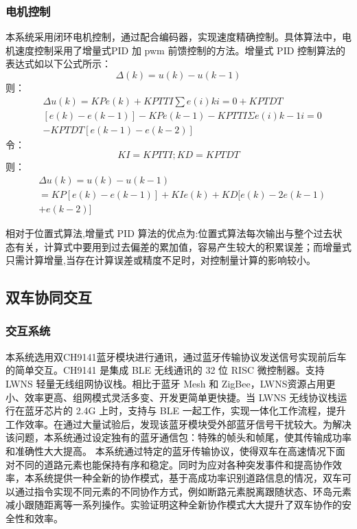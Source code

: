 \documentclass{article}%
\begin{document}
\begin{multicols}{2}
		\subsubsection{电机控制}
		本系统采用闭环电机控制，通过配合编码器，实现速度精确控制。具体算法中，电机速度控制采用了增量式PID 加 pwm 前馈控制的方法。增量式 PID 控制算法的表达式如以下公式所示：
		\begin{equation}
			\Delta(k) = u(k)-u(k-1)
		\end{equation}	
		则：
		\begin{equation}					
			\begin{split}				
				&\Delta u(k) = K P e(k)+K P T T I \sum e(i) k i = 0+K P T D T \\
				&[e(k)-e(k-1)]-K P e(k-1)-K P T T I \Sigma e(i) k-1 i = 0 \\
				& -K P T D T[e(k-1)-e(k-2)] 
			\end{split}
		\end{equation}						
		令：
		\begin{equation}
			 K I = K P T T I ; K D = K P T D T 
		\end{equation}
		则：	
		\begin{equation}
			\begin{split}	
				&\Delta u(k) = u(k)-u(k-1) \\
				&= K P[e(k)-e(k-1)]+K I e(k)+K D[e(k)-2 e(k-1)\\
				&+e(k-2)]
			\end{split}	
		\end{equation}
		
		相对于位置式算法,增量式 PID 算法的优点为:位置式算法每次输出与整个过去状态有关，计算式中要用到过去偏差的累加值，容易产生较大的积累误差；而增量式只需计算增量,当存在计算误差或精度不足时，对控制量计算的影响较小。
		
		
		\subsection{双车协同交互}
		
		\subsubsection{交互系统}
		
		本系统选用双CH9141蓝牙模块进行通讯，通过蓝牙传输协议发送信号实现前后车的简单交互。CH9141 是集成 BLE 无线通讯的 32 位 RISC 微控制器。支持 LWNS 轻量无线组网协议栈。相比于蓝牙 Mesh 和 ZigBee，LWNS资源占用更小、效率更高、组网模式灵活多变、开发更简单更快捷。当 LWNS 无线协议栈运行在蓝牙芯片的 2.4G 上时，支持与 BLE 一起工作，实现一体化工作流程，提升工作效率。在通过大量试验后，发现该蓝牙模块受外部蓝牙信号干扰较大。为解决该问题，本系统通过设定独有的蓝牙通信包：特殊的帧头和帧尾，使其传输成功率和准确性大大提高。 本系统通过特定的蓝牙传输协议，使得双车在高速情况下面对不同的道路元素也能保持有序和稳定。同时为应对各种突发事件和提高协作效率，本系统提供一种全新的协作模式，基于高成功率识别道路信息的情况，双车可以通过指令实现不同元素的不同协作方式，例如断路元素脱离跟随状态、环岛元素减小跟随距离等一系列操作。实验证明这种全新协作模式大大提升了双车协作的安全性和效率。
		

\end{multicols}
\end{document}

